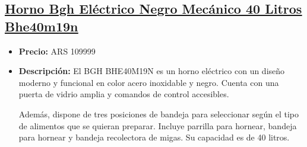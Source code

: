 \documentclass{article}
\begin{document}
\begin{adjustwidth}{2em}{}
\vspace{1\baselineskip} %
\end{adjustwidth}


\begin{adjustwidth}{2em}{}

\subsection{\uline{\href{https://www.mercadolibre.com.ar/horno-bgh-electrico-negro-mecanico-40-litros-bhe40m19n/p/MLA14960487}{Horno Bgh Eléctrico Negro Mecánico 40 Litros Bhe40m19n}}}
\begin{itemize}
    \item \textbf{Precio:} ARS 109999
    \item \textbf{Descripción:} El BGH BHE40M19N es un horno eléctrico con un diseño moderno y funcional en color acero inoxidable y negro. Cuenta con una puerta de vidrio amplia y comandos de control accesibles.

Además, dispone de tres posiciones de bandeja para seleccionar según el tipo de alimentos que se quieran preparar. Incluye parrilla para hornear, bandeja para hornear y bandeja recolectora de migas. Su capacidad es de 40 litros.


\end{itemize}
\end{adjustwidth}
\end{document}
